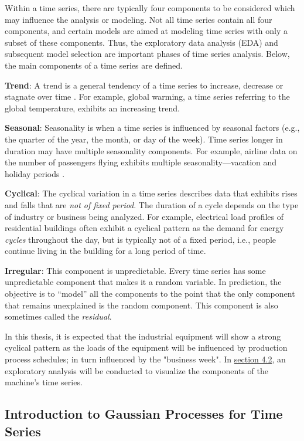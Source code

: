 Within a time series, there are typically four components to be considered which may influence the analysis or modeling. Not all time series contain all four components, and certain models are aimed at modeling time series with only a subset of these components. Thus, the exploratory data analysis (EDA) and subsequent model selection are important phases of time series analysis. Below, the main components of a time series are defined.

\textbf{Trend}: A trend is a general tendency of a time series to increase, decrease or stagnate over time \cite{Applied Time Series Analysis}. For example, global warming, a time series referring to the global temperature, exhibits an increasing trend. 

\textbf{Seasonal}: Seasonality is when a time series is influenced by seasonal factors (e.g., the quarter of the year, the month, or day of the week). Time series longer in duration may have multiple seasonality components. For example, airline data on the number of passengers flying exhibits multiple seasonality—vacation and holiday periods \cite{Applied Time Series Analysis}.

\textbf{Cyclical}: The cyclical variation in a time series describes data that exhibits rises and falls that are \textit{not of fixed period}. The duration of a cycle depends on the type of industry or business being analyzed. For example, electrical load profiles of residential buildings often exhibit a cyclical pattern as the demand for energy \textit{cycles} throughout the day, but is typically not of a fixed period, i.e., people continue living in the building for a long period of time. 

\textbf{Irregular}: This component is unpredictable. Every time series has some unpredictable component that makes it a random variable. In prediction, the objective is to “model” all the components to the point that the only component that remains unexplained is the random component. This component is also sometimes called the \textit{residual}. 

In this thesis, it is expected that the industrial equipment will show a strong cyclical pattern as the loads of the equipment will be influenced by production process schedules; in turn influenced by the "business week". In \hyperlink{subsection.4.2}{section 4.2}, an exploratory analysis will be conducted to visualize the components of the machine's time series. 


\subsection{Introduction to Gaussian Processes for Time Series}

